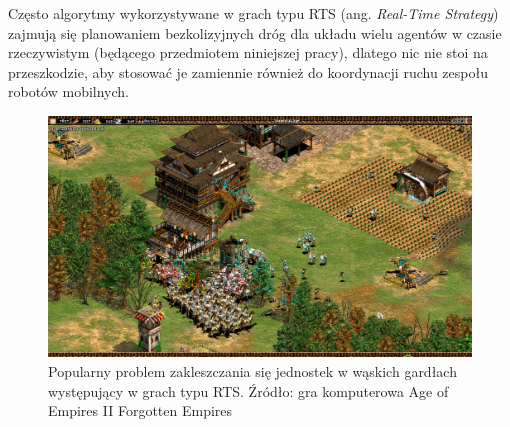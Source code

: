 Często algorytmy wykorzystywane w grach typu RTS (ang. {\it Real-Time Strategy}) zajmują się planowaniem bezkolizyjnych dróg dla układu wielu agentów w czasie rzeczywistym (będącego przedmiotem niniejszej pracy), dlatego nic nie stoi na przeszkodzie, aby stosować je zamiennie również do koordynacji ruchu zespołu robotów mobilnych.

\begin{figure}[H]
	\centering
	\includegraphics[width=15cm]{img/games/age-deadlock2}
	\caption{Popularny problem zakleszczania się jednostek w wąskich gardłach występujący w grach typu RTS. Źródło: gra komputerowa Age of Empires II Forgotten Empires}
	\label{fig:img_games_age-deadlock}
\end{figure}
